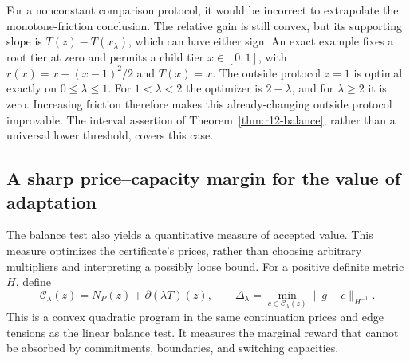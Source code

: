 For a nonconstant comparison protocol, it would be incorrect to extrapolate the monotone-friction conclusion. The relative gain is still convex, but its supporting slope is $T(z)-T(x_\lambda)$, which can have either sign. An exact example fixes a root tier at zero and permits a child tier $x\in[0,1]$, with $r(x)=x-(x-1)^2/2$ and $T(x)=x$. The outside protocol $z=1$ is optimal exactly on $0\leq\lambda\leq1$. For $1<\lambda<2$ the optimizer is $2-\lambda$, and for $\lambda\geq2$ it is zero. Increasing friction therefore makes this already-changing outside protocol improvable. The interval assertion of Theorem~\ref{thm:r12-balance}, rather than a universal lower threshold, covers this case.


\subsection{A sharp price--capacity margin for the value of adaptation}
The balance test also yields a quantitative measure of accepted value. This measure optimizes the certificate's prices, rather than choosing arbitrary multipliers and interpreting a possibly loose bound. For a positive definite metric $H$, define
\begin{equation}\label{eq:r12-margin}
 \mathcal C_\lambda(z)=N_P(z)+\partial(\lambda T)(z),\qquad
 \Delta_\lambda=\min_{c\in\mathcal C_\lambda(z)}\|g-c\|_{H^{-1}}.
\end{equation}
This is a convex quadratic program in the same continuation prices and edge tensions as the linear balance test. It measures the marginal reward that cannot be absorbed by commitments, boundaries, and switching capacities.

